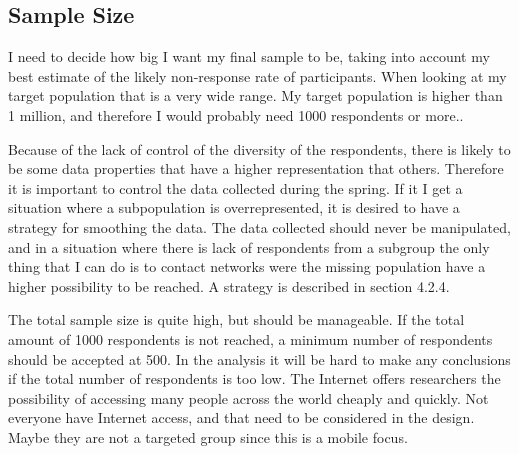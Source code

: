   \subsection{Sample Size}
    I need to decide how big I want my final sample to be, taking into account my best estimate of the likely non-response rate of participants. When looking at my target population that is a very wide range. My target population is higher than 1 million, and therefore I would probably need 1000 respondents or more..

    Because of the lack of control of the diversity of the respondents, there is likely to be some data properties that have a higher representation that others. Therefore it is important to control the data collected during the spring. If it I get a situation where a subpopulation is overrepresented, it is desired to have a strategy for smoothing the data. The data collected should never be manipulated, and in a situation where there is lack of respondents from a subgroup the only thing that I can do is to contact networks were the missing population have a higher possibility to be reached. A strategy is described in section 4.2.4. 

    The total sample size is quite high, but should be manageable. If the total amount of 1000 respondents is not reached, a minimum number of respondents should be accepted at 500. In the analysis it will be hard to make any conclusions if the total number of respondents is too low.  The Internet offers researchers the possibility of accessing many people across the world cheaply and quickly. Not everyone have Internet access, and that need to be considered in the design. Maybe they are not a targeted group since this is a mobile focus.

